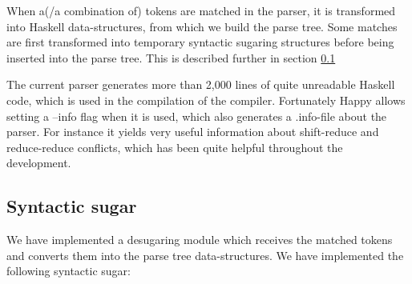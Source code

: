 When a(/a combination of) tokens are matched in the parser, it is transformed into Haskell data-structures, from which we build the parse tree. Some matches are first transformed into temporary syntactic sugaring structures before being inserted into the parse tree. This is described further in section \ref{sec:imp-sugar}

The current parser generates more than 2,000 lines of quite unreadable Haskell code, which is used in the compilation of the compiler. Fortunately Happy allows setting a --info flag when it is used, which also generates a .info-file about the parser. For instance it yields very useful information about shift-reduce and reduce-reduce conflicts, which has been quite helpful throughout the development.


\subsection{Syntactic sugar}
\label{sec:imp-sugar}
We have implemented a desugaring module which receives the matched tokens and converts them into the parse tree data-structures. We have implemented the following syntactic sugar:

